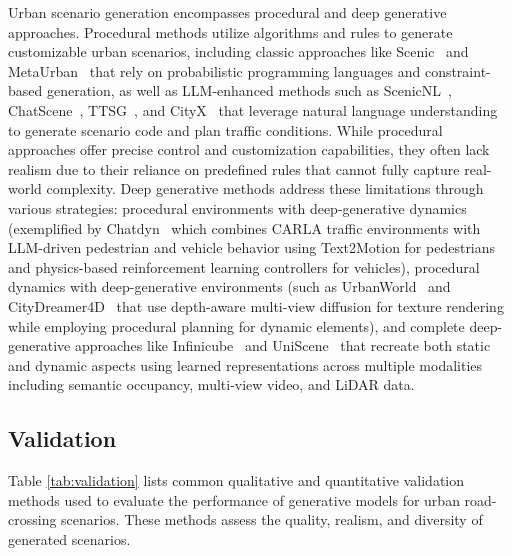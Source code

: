 \documentclass{article}
\begin{document}
Urban scenario generation encompasses procedural and deep generative approaches. Procedural methods utilize algorithms and rules to generate customizable urban scenarios, including classic approaches like Scenic~\cite{fremont2019scenic} and MetaUrban~\cite{wu2024metaurban} that rely on probabilistic programming languages and constraint-based generation, as well as LLM-enhanced methods such as ScenicNL~\cite{elmaaroufi2024scenicnl}, ChatScene~\cite{zhang2024chatscene}, TTSG~\cite{ruan2024traffic}, and CityX~\cite{zhang2024cityx} that leverage natural language understanding to generate scenario code and plan traffic conditions. While procedural approaches offer precise control and customization capabilities, they often lack realism due to their reliance on predefined rules that cannot fully capture real-world complexity. Deep generative methods address these limitations through various strategies: procedural environments with deep-generative dynamics (exemplified by Chatdyn~\cite{wei2024chatdyn} which combines CARLA traffic environments with LLM-driven pedestrian and vehicle behavior using Text2Motion for pedestrians and physics-based reinforcement learning controllers for vehicles), procedural dynamics with deep-generative environments (such as UrbanWorld~\cite{shang2024urbanworld} and CityDreamer4D~\cite{xie2024citydreamer} that use depth-aware multi-view diffusion for texture rendering while employing procedural planning for dynamic elements), and complete deep-generative approaches like Infinicube~\cite{lu2024infinicube} and UniScene~\cite{li2025uniscene} that recreate both static and dynamic aspects using learned representations across multiple modalities including semantic occupancy, multi-view video, and LiDAR data.

\subsection{Validation}

Table \ref{tab:validation} lists common qualitative and quantitative validation methods used to evaluate the performance of generative models for urban road-crossing scenarios. These methods assess the quality, realism, and diversity of generated scenarios.
\end{document}
